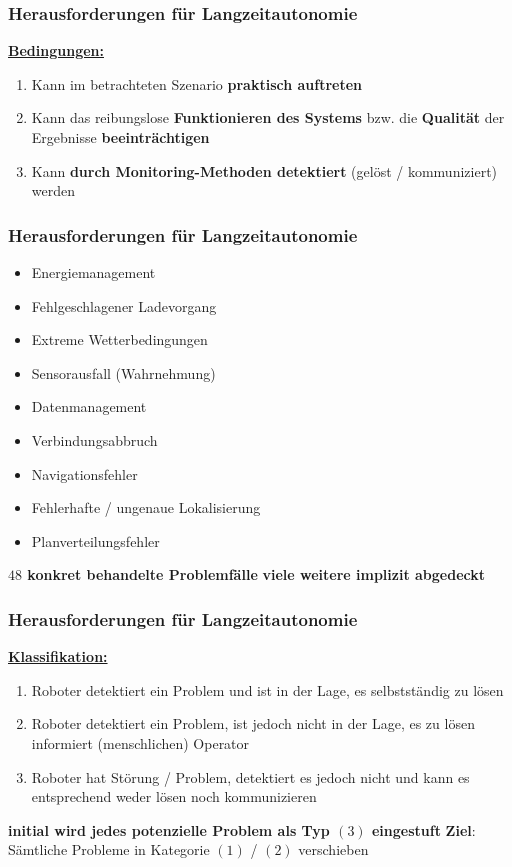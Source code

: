 \documentclass{beamer}
\begin{document}
\begin{frame}
  \frametitle{Herausforderungen für Langzeitautonomie}
  \textbf{\underline{Bedingungen:}}
  \begin{enumerate}
    \item Kann im betrachteten Szenario \textbf{praktisch auftreten}
    \item Kann das reibungslose \textbf{Funktionieren des Systems} bzw. die \textbf{Qualität} der Ergebnisse \textbf{beeinträchtigen}
    \item Kann \textbf{durch Monitoring-Methoden detektiert} (gelöst / kommuniziert) werden
  \end{enumerate}
\end{frame}

\begin{frame}
  \frametitle{Herausforderungen für Langzeitautonomie}
  \begin{itemize}
    \item Energiemanagement
    \item Fehlgeschlagener Ladevorgang
    \item Extreme Wetterbedingungen
    \item Sensorausfall (Wahrnehmung)
    \item Datenmanagement
    \item Verbindungsabbruch
    \item Navigationsfehler
    \item Fehlerhafte / ungenaue Lokalisierung
    \item Planverteilungsfehler
  \end{itemize}
  \textrightarrow \thinspace \textbf{$48$ konkret behandelte Problemfälle}\newline
  \textrightarrow \thinspace \textbf{viele weitere implizit abgedeckt}
\end{frame}

\begin{frame}
  \frametitle{Herausforderungen für Langzeitautonomie}
  \textbf{\underline{Klassifikation:}}
  \begin{enumerate}
    \item Roboter detektiert ein Problem und ist in der Lage, es selbstständig zu lösen
    \item Roboter detektiert ein Problem, ist jedoch nicht in der Lage, es zu lösen \textrightarrow \thinspace informiert (menschlichen) Operator
    \item Roboter hat Störung / Problem, detektiert es jedoch nicht und kann es entsprechend weder lösen noch kommunizieren
  \end{enumerate}
  \textrightarrow \thinspace \textbf{initial wird jedes potenzielle Problem als Typ $(3)$ eingestuft}\newline
  \textbf{Ziel}: Sämtliche Probleme in Kategorie $(1)$ / $(2)$ verschieben
\end{frame}
\end{document}
